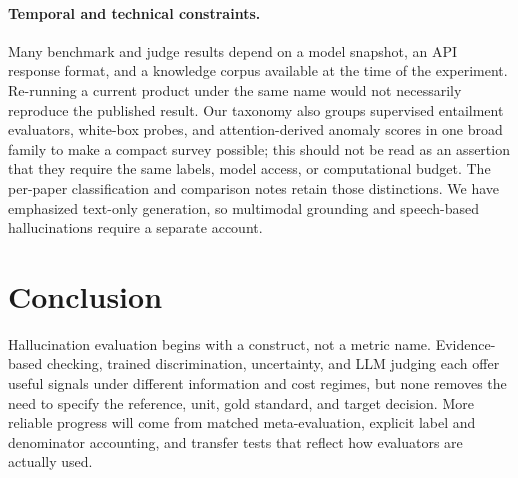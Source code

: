 \documentclass[11pt]{article}
\begin{document}
\paragraph{Temporal and technical constraints.} Many benchmark and judge results depend on a model snapshot, an API response format, and a knowledge corpus available at the time of the experiment. Re-running a current product under the same name would not necessarily reproduce the published result. Our taxonomy also groups supervised entailment evaluators, white-box probes, and attention-derived anomaly scores in one broad family to make a compact survey possible; this should not be read as an assertion that they require the same labels, model access, or computational budget. The per-paper classification and comparison notes retain those distinctions. We have emphasized text-only generation, so multimodal grounding and speech-based hallucinations require a separate account.

\section{Conclusion}
Hallucination evaluation begins with a construct, not a metric name. Evidence-based checking, trained discrimination, uncertainty, and LLM judging each offer useful signals under different information and cost regimes, but none removes the need to specify the reference, unit, gold standard, and target decision. More reliable progress will come from matched meta-evaluation, explicit label and denominator accounting, and transfer tests that reflect how evaluators are actually used.

\clearpage

\end{document}
